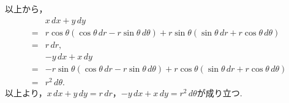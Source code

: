 \begin{tanswer}
\[  \]
  以上から，
  \begin{align*}
      & x \, dx +y \, dy                                                                                                          \\
    = & r \cos \theta(\cos \theta \, dr - r \sin \theta \, d \theta)+r \sin \theta(\sin \theta \, dr + r \cos \theta \, d \theta) \\
    = & r \, dr,                                                                                                                  \\
      & -y \, dx + x \, dy                                                                                                        \\
    = & -r \sin \theta (\cos \theta  \, dr -r\sin \theta \, d\theta)+r \cos \theta (\sin \theta \, dr + r \cos \theta \, d\theta) \\
    = & r^2 \, d \theta.
  \end{align*}
  以上より，$x \, dx +y \, dy = r \, dr$，$-y \, dx + x \, dy  = r^2 \, d \theta$が成り立つ.
\end{tanswer}